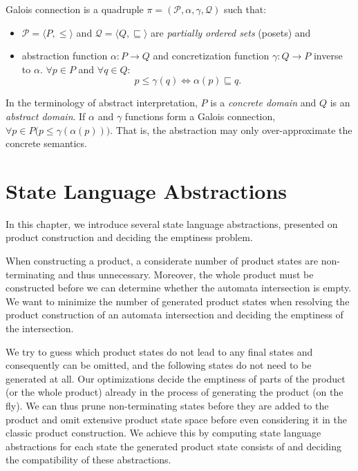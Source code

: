 \begin{definition} \hfill \newline
Galois connection is a quadruple $\pi = (\mathcal{P}, \alpha, \gamma, \mathcal{Q})$ such that:

\begin{itemize}
    \item $\mathcal{P} = \langle P, \leq \rangle$ and $\mathcal{Q} = \langle Q, \sqsubseteq \rangle$ are \emph{partially ordered sets} (posets) and
    \item abstraction function $\alpha : P \rightarrow Q$ and concretization function $\gamma : Q \rightarrow P$ inverse to $\alpha$. $\forall p \in P$ and $\forall q \in Q$:
    \[
        p \leq \gamma(q) \Leftrightarrow \alpha(p) \sqsubseteq q \text{.}
    \]
\end{itemize}

\end{definition}

In the terminology of abstract interpretation, $P$ is a \emph{concrete domain} and $Q$ is an \emph{abstract domain}. If $\alpha$ and $\gamma$ functions form a Galois connection, $\forall p \in P \bigr( p \leq \gamma(\alpha(p)) \bigr)$. That is, the abstraction may only over-approximate the concrete semantics.


\chapter{State Language Abstractions}

In this chapter, we introduce several state language abstractions, presented on product construction and deciding the emptiness problem.

When constructing a product, a considerate number of product states are non-terminating and thus unnecessary. Moreover, the whole product must be constructed before we can determine whether the automata intersection is empty. We want to minimize the number of generated product states when resolving the product construction of an automata intersection and deciding the emptiness of the intersection.

We try to guess which product states do not lead to any final states and consequently can be omitted, and the following states do not need to be generated at all. Our optimizations decide the emptiness of parts of the product (or the whole product) already in the process of generating the product (on the fly). We can thus prune non-terminating states before they are added to the product and omit extensive product state space before even considering it in the classic product construction. We achieve this by computing state language abstractions for each state the generated product state consists of and deciding the compatibility of these abstractions.

